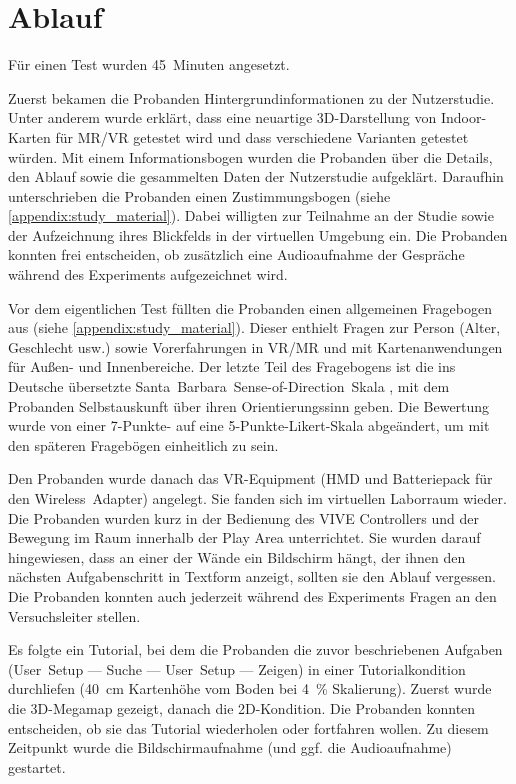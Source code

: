 \section{Ablauf}
Für einen Test wurden \num{45}~Minuten angesetzt.

Zuerst bekamen die Probanden Hintergrundinformationen zu der Nutzerstudie.
Unter anderem wurde erklärt, dass eine neuartige 3D-Darstellung von Indoor-Karten für MR/VR getestet wird und dass verschiedene Varianten getestet würden.
Mit einem Informationsbogen wurden die Probanden über die Details, den Ablauf sowie die gesammelten Daten der Nutzerstudie aufgeklärt.
Daraufhin unterschrieben die Probanden einen Zustimmungsbogen (siehe \autoref{appendix:study_material}).
Dabei willigten zur Teilnahme an der Studie sowie der Aufzeichnung ihres Blickfelds in der virtuellen Umgebung ein.
Die Probanden konnten frei entscheiden, ob zusätzlich eine Audioaufnahme der Gespräche während des Experiments aufgezeichnet wird.

Vor dem eigentlichen Test füllten die Probanden einen allgemeinen Fragebogen aus (siehe \autoref{appendix:study_material}).
Dieser enthielt Fragen zur Person (Alter, Geschlecht usw.) sowie Vorerfahrungen in VR/MR und mit Kartenanwendungen für Außen- und Innenbereiche. Der letzte Teil des Fragebogens ist die ins Deutsche übersetzte Santa~Barbara~Sense-of-Direction~Skala \parencite{Hegarty2002}, mit dem Probanden Selbstauskunft über ihren Orientierungssinn geben.
Die Bewertung wurde von einer 7-Punkte- auf eine 5-Punkte-Likert-Skala abgeändert, um mit den späteren Fragebögen einheitlich zu sein.

Den Probanden wurde danach das VR-Equipment (HMD und Batteriepack für den Wireless~Adapter) angelegt.
Sie fanden sich im virtuellen Laborraum wieder.
Die Probanden wurden kurz in der Bedienung des VIVE Controllers und der Bewegung im Raum innerhalb der Play Area unterrichtet.
Sie wurden darauf hingewiesen, dass an einer der Wände ein Bildschirm hängt, der ihnen den nächsten Aufgabenschritt in Textform anzeigt, sollten sie den Ablauf vergessen.
Die Probanden konnten auch jederzeit während des Experiments Fragen an den Versuchsleiter stellen.

Es folgte ein Tutorial, bei dem die Probanden die zuvor beschriebenen Aufgaben (User~Setup --- Suche --- User~Setup --- Zeigen) in einer Tutorialkondition durchliefen (\SI{40}{\cm} Kartenhöhe vom Boden bei \SI{4}{\percent} Skalierung).
Zuerst wurde die 3D-Megamap gezeigt, danach die 2D-Kondition.
Die Probanden konnten entscheiden, ob sie das Tutorial wiederholen oder fortfahren wollen.
Zu diesem Zeitpunkt wurde die Bildschirmaufnahme (und ggf. die Audioaufnahme) gestartet.

